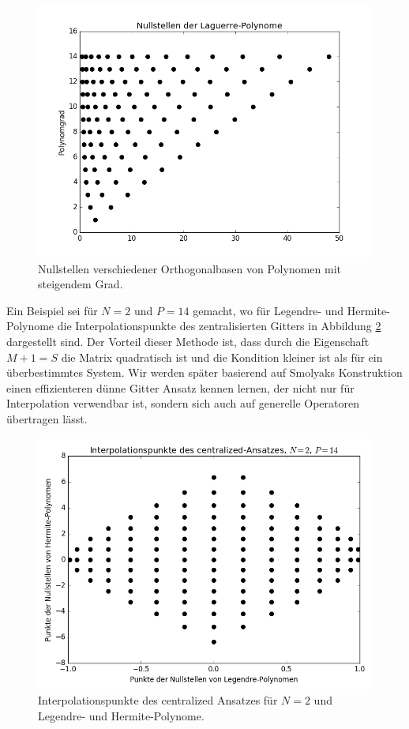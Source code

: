 \begin{figure}[!htb]
  \includegraphics[width=\linewidth]{Figures/roots_laguerre.png}  
\endminipage
\caption{Nullstellen verschiedener Orthogonalbasen von Polynomen mit steigendem Grad.}
\label{fig:poly_roots}
\end{figure}

Ein Beispiel sei für $N=2$ und $P=14$ gemacht, wo für Legendre- und Hermite-Polynome die Interpolationspunkte des zentralisierten Gitters in Abbildung \ref{fig:roots_centralized} dargestellt sind. Der Vorteil dieser Methode ist, dass durch die Eigenschaft $M+1=S$ die Matrix quadratisch ist und die Kondition kleiner ist als für ein überbestimmtes System. Wir werden später basierend auf Smolyaks Konstruktion einen effizienteren dünne Gitter Ansatz kennen lernen, der nicht nur für Interpolation verwendbar ist, sondern sich auch auf generelle Operatoren übertragen lässt.
\begin{figure}[!htb]
\centering
\includegraphics[width=0.8\linewidth]{Figures/roots_centralized.png}
\caption{Interpolationspunkte des centralized Ansatzes für $N=2$ und Legendre- und Hermite-Polynome.}
\label{fig:roots_centralized}
\end{figure}
